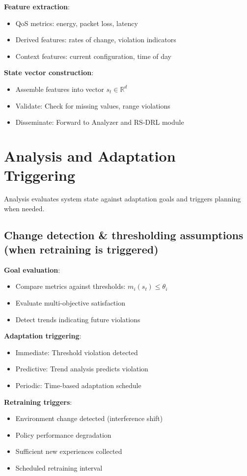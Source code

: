 \documentclass[11pt,a4paper]{article}
\begin{document}
\textbf{Feature extraction}:
\begin{itemize}
    \item QoS metrics: energy, packet loss, latency
    \item Derived features: rates of change, violation indicators
    \item Context features: current configuration, time of day
\end{itemize}

\textbf{State vector construction}:
\begin{itemize}
    \item Assemble features into vector $s_t \in \mathbb{R}^d$
    \item Validate: Check for missing values, range violations
    \item Disseminate: Forward to Analyzer and RS-DRL module
\end{itemize}

\section{Analysis and Adaptation Triggering}

Analysis evaluates system state against adaptation goals and triggers planning when needed.

\subsection{Change detection \& thresholding assumptions (when retraining is triggered)}

\textbf{Goal evaluation}:
\begin{itemize}
    \item Compare metrics against thresholds: $m_i(s_t) \leq \theta_i$
    \item Evaluate multi-objective satisfaction
    \item Detect trends indicating future violations
\end{itemize}

\textbf{Adaptation triggering}:
\begin{itemize}
    \item Immediate: Threshold violation detected
    \item Predictive: Trend analysis predicts violation
    \item Periodic: Time-based adaptation schedule
\end{itemize}

\textbf{Retraining triggers}:
\begin{itemize}
    \item Environment change detected (interference shift)
    \item Policy performance degradation
    \item Sufficient new experiences collected
    \item Scheduled retraining interval
\end{itemize}
\end{document}
